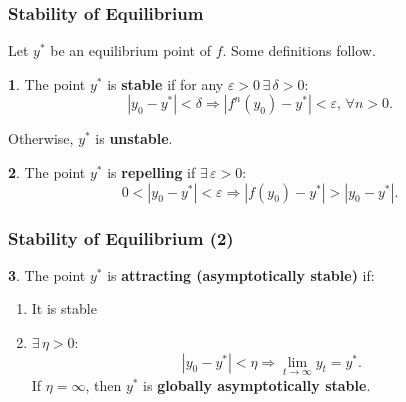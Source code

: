 \documentclass[10pt,usenames,dvipsnames]{beamer}
\theoremstyle{plain}
\theoremstyle{definition}
\newtheorem{defn}{\translate{Definition}}
\begin{document}
\begin{frame}[fragile]
\frametitle{Stability of Equilibrium}
Let $y^{*}$ be an equilibrium point of $f$. Some definitions follow.
\begin{defn}
	The point $y^{*}$ is \textbf{stable} if for any $\varepsilon > 0\,\exists\, \delta > 0$:
\[
	|y_{0} - y^{*}| < \delta \Rightarrow |f^{n}(y_{0}) - y^{*}| < \varepsilon, \, \forall n > 0.
\]

Otherwise, $y^{*}$ is \textbf{unstable}.
\end{defn}

\begin{defn}
	The point $y^{*}$ is \textbf{repelling} if $\exists\,\varepsilon > 0$:
\[
	0 < |y_{0} - y^{*}| < \varepsilon \Rightarrow |f(y_{0}) - y^{*}| > |y_{0} - y^{*}|.
\]
\end{defn}
\end{frame}

\begin{frame}[fragile]
\frametitle{Stability of Equilibrium (2)}
\begin{defn}
	The point $y^{*}$ is \textbf{attracting (asymptotically stable)} if:
	\begin{enumerate}
		\item It is stable
		\item $\exists\,\eta > 0$:
		\[
			|y_{0} - y^{*}| < \eta \Rightarrow \lim_{t\to\infty}y_{t} = y^{*}.
		\]
		If $\eta = \infty$, then $y^{*}$ is \textbf{globally asymptotically stable}.
	\end{enumerate}		 
\end{defn}
\end{frame}
\end{document}
